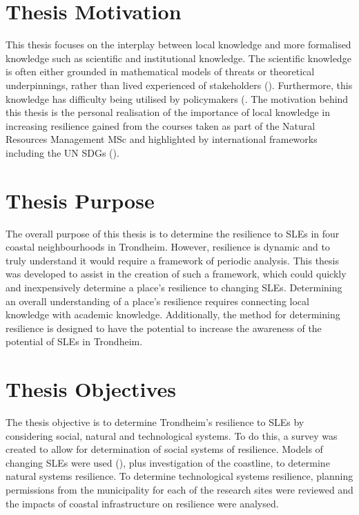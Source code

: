 \paragraph{}

\section{Thesis Motivation}
 This thesis focuses on the interplay between local knowledge and more formalised knowledge such as scientific and institutional knowledge. The scientific knowledge is often either grounded in mathematical models of threats or theoretical underpinnings, rather than lived experienced of stakeholders (\cite{gerkensmeier_governing_2018}). Furthermore, this knowledge has difficulty being utilised by policymakers (\cite{gerkensmeier_governing_2018}. The motivation behind this thesis is the personal realisation of the importance of local knowledge in increasing resilience gained from the courses taken as part of the Natural Resources Management MSc and highlighted by international frameworks including the UN SDGs (\cite{united_nations_department_for_economic_and_social_affairs_sustainable_2021}).  

\section{Thesis Purpose}
The overall purpose of this thesis is to determine the resilience to SLEs in four coastal neighbourhoods in Trondheim. However, resilience is dynamic and to truly understand it would require a framework of periodic analysis. This thesis was developed to assist in the creation of such a framework, which could quickly and inexpensively determine a place's resilience to changing SLEs. Determining an overall understanding of a place's resilience requires connecting local knowledge with academic knowledge. Additionally, the method for determining resilience is designed to have the potential to increase the awareness of the potential of SLEs in Trondheim. 


 


\section{Thesis Objectives}
The thesis objective is to determine Trondheim's resilience to SLEs by considering social, natural and technological systems. To do this, a survey was created to allow for determination of social systems of resilience.  Models of changing SLEs were used (\cite{kartverket_se_2020}), plus investigation of the coastline, to determine natural systems resilience. To determine technological systems resilience, planning permissions from the municipality for each of the research sites were reviewed and the impacts of coastal infrastructure on resilience were analysed.

